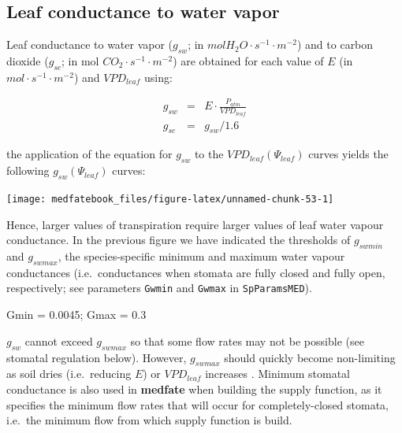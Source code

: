 \documentclass[]{book}
\newenvironment{Shaded}{\begin{snugshade}}{\end{snugshade}}
\newcommand{\FloatTok}[1]{\textcolor[rgb]{0.00,0.00,0.81}{#1}}
\newcommand{\StringTok}[1]{\textcolor[rgb]{0.31,0.60,0.02}{#1}}
\newcommand{\NormalTok}[1]{#1}
\begin{document}
\subsection{Leaf conductance to water
vapor}\label{leaf-conductance-to-water-vapor}

Leaf conductance to water vapor (\(g_{sw}\); in
\(mol H_2O \cdot s^{-1} \cdot m^{-2}\)) and to carbon dioxide
(\(g_{sc}\); in mol \(CO_{2} \cdot s^{-1} \cdot m^{-2}\)) are obtained
for each value of \(E\) (in \(mol \cdot s^{-1} \cdot m^{-2}\)) and
\(VPD_{leaf}\) using:

\begin{eqnarray}
g_{sw} &=& E \cdot \frac{P_{atm}}{VPD_{leaf}}\\
g_{sc} &=& g_{sw}/1.6
\end{eqnarray}

the application of the equation for \(g_{sw}\) to the
\(VPD_{leaf}(\Psi_{leaf})\) curves yields the following
\(g_{sw}(\Psi_{leaf})\) curves:

\begin{center}\texttt{[image: medfatebook\_files/figure-latex/unnamed-chunk-53-1]} \end{center}

Hence, larger values of transpiration require larger values of leaf
water vapour conductance. In the previous figure we have indicated the
thresholds of \(g_{swmin}\) and \(g_{swmax}\), the species-specific
minimum and maximum water vapour conductances (i.e.~conductances when
stomata are fully closed and fully open, respectively; see parameters
\texttt{Gwmin} and \texttt{Gwmax} in \texttt{SpParamsMED}).

\begin{Shaded}
\begin{Highlighting}[]
\NormalTok{Gmin =}\StringTok{ }\FloatTok{0.0045}\NormalTok{;}
\NormalTok{Gmax =}\StringTok{ }\FloatTok{0.3}
\end{Highlighting}
\end{Shaded}

\(g_{sw}\) cannot exceed \(g_{swmax}\) so that some flow rates may not
be possible (see stomatal regulation below). However, \(g_{swmax}\)
should quickly become non-limiting as soil dries (i.e.~reducing \(E\))
or \(VPD_{leaf}\) increases \citep{Sperry2016}. Minimum stomatal
conductance is also used in \textbf{medfate} when building the supply
function, as it specifies the minimum flow rates that will occur for
completely-closed stomata, i.e.~the minimum flow from which supply
function is build.
\end{document}
